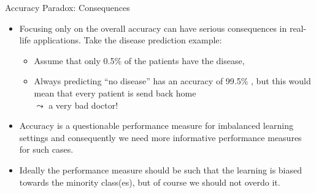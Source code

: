 \begin{vbframe}{Accuracy Paradox: Consequences}
	\small
	\begin{itemize}
		\item Focusing only on the overall accuracy can have serious consequences in real-life applications. Take the disease prediction example:
%		
		\begin{itemize}
			\small
%			
			\item Assume that only 0.5\% of the patients have the disease,
%			
			\item Always predicting ``no disease'' has an accuracy of 99.5\% , but this would mean that every patient is send back home \\
%			
			$\leadsto$ a very bad doctor!
%			
		\end{itemize}
		\item Accuracy is a questionable performance measure for imbalanced learning settings and consequently we need more informative performance measures for such cases.
		\item Ideally the performance measure should be such that the learning is biased towards the minority class(es), but of course we should not overdo it.
%		
	\end{itemize}
\end{vbframe} 


